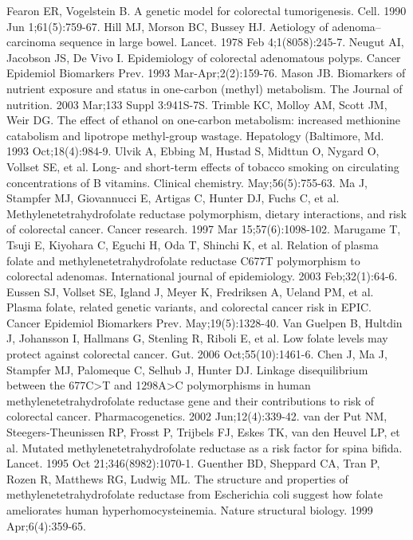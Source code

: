 \begin{thebibliography}{12}
		Fearon ER, Vogelstein B. A genetic model for colorectal tumorigenesis. Cell. 1990 Jun 1;61(5):759-67. 
		Hill MJ, Morson BC, Bussey HJ. Aetiology of adenoma--carcinoma sequence in large bowel. Lancet. 1978 Feb 4;1(8058):245-7. 
		Neugut AI, Jacobson JS, De Vivo I. Epidemiology of colorectal adenomatous polyps. Cancer Epidemiol Biomarkers Prev. 1993 Mar-Apr;2(2):159-76. 
		Mason JB. Biomarkers of nutrient exposure and status in one-carbon (methyl) metabolism. The Journal of nutrition. 2003 Mar;133 Suppl 3:941S-7S. 
		Trimble KC, Molloy AM, Scott JM, Weir DG. The effect of ethanol on one-carbon metabolism: increased methionine catabolism and lipotrope methyl-group wastage. Hepatology (Baltimore, Md. 1993 Oct;18(4):984-9. 
		Ulvik A, Ebbing M, Hustad S, Midttun O, Nygard O, Vollset SE, et al. Long- and short-term effects of tobacco smoking on circulating concentrations of B vitamins. Clinical chemistry.  May;56(5):755-63. 
		Ma J, Stampfer MJ, Giovannucci E, Artigas C, Hunter DJ, Fuchs C, et al. Methylenetetrahydrofolate reductase polymorphism, dietary interactions, and risk of colorectal cancer. Cancer research. 1997 Mar 15;57(6):1098-102. 
		Marugame T, Tsuji E, Kiyohara C, Eguchi H, Oda T, Shinchi K, et al. Relation of plasma folate and methylenetetrahydrofolate reductase C677T polymorphism to colorectal adenomas. International journal of epidemiology. 2003 Feb;32(1):64-6. 
		Eussen SJ, Vollset SE, Igland J, Meyer K, Fredriksen A, Ueland PM, et al. Plasma folate, related genetic variants, and colorectal cancer risk in EPIC. Cancer Epidemiol Biomarkers Prev.  May;19(5):1328-40. 
		Van Guelpen B, Hultdin J, Johansson I, Hallmans G, Stenling R, Riboli E, et al. Low folate levels may protect against colorectal cancer. Gut. 2006 Oct;55(10):1461-6. 
		Chen J, Ma J, Stampfer MJ, Palomeque C, Selhub J, Hunter DJ. Linkage disequilibrium between the 677C>T and 1298A>C polymorphisms in human methylenetetrahydrofolate reductase gene and their contributions to risk of colorectal cancer. Pharmacogenetics. 2002 Jun;12(4):339-42. 
		van der Put NM, Steegers-Theunissen RP, Frosst P, Trijbels FJ, Eskes TK, van den Heuvel LP, et al. Mutated methylenetetrahydrofolate reductase as a risk factor for spina bifida. Lancet. 1995 Oct 21;346(8982):1070-1. 
		Guenther BD, Sheppard CA, Tran P, Rozen R, Matthews RG, Ludwig ML. The structure and properties of methylenetetrahydrofolate reductase from Escherichia coli suggest how folate ameliorates human hyperhomocysteinemia. Nature structural biology. 1999 Apr;6(4):359-65. 

\end{thebibliography}

